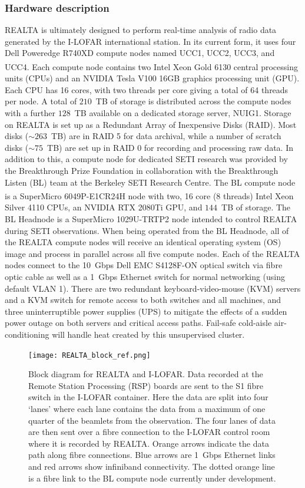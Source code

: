 \subsubsection{Hardware description}
REALTA is ultimately designed to perform real-time analysis of radio data generated by the I-LOFAR international station. In its current form, it uses four Dell Poweredge R740XD compute nodes named UCC1, UCC2, UCC3, and UCC4. Each compute node contains two Intel Xeon\textsuperscript{\textregistered} Gold 6130 central processing units (CPUs) and an NVIDIA Tesla V100 16GB graphics processing unit (GPU). Each CPU has 16 cores, with two threads per core giving a total of 64 threads per node.  A total of $210$~TB of storage is distributed across the compute nodes with a further $128$~TB available on a dedicated storage server, NUIG1. Storage on REALTA is set up as a Redundant Array of Inexpensive Disks (RAID). Most disks ($\sim 263$~TB) are in RAID 5 for data archival, while a number of scratch disks ($\sim 75$~TB) are set up in RAID 0 for recording and processing raw data. In addition to this, a compute node for dedicated SETI research was provided by the Breakthrough Prize Foundation in collaboration with the Breakthrough Listen (BL) team at the Berkeley SETI Research Centre. The BL compute node is a SuperMicro 6049P-E1CR24H node with two, 16 core (8 threads) Intel Xeon\textsuperscript{\textregistered} Silver 4110 CPUs, an NVIDIA RTX 2080Ti GPU, and $144$~TB of storage. The BL Headnode is a SuperMicro 1029U-TRTP2 node intended to control REALTA during SETI observations. When being operated from the BL Headnode, all of the REALTA compute nodes will receive an identical operating system (OS) image and process in parallel across all five compute nodes. Each of the REALTA nodes connect to the 10~Gbps Dell EMC S4128F-ON optical switch via fibre optic cable as well as a 1~Gbps Ethernet switch for normal networking (using default VLAN 1). There are two redundant keyboard-video-mouse (KVM) servers and a KVM switch for remote access to both switches and all machines, and three uninterruptible power supplies (UPS) to mitigate the effects of a sudden power outage on both servers and critical access paths. Fail-safe cold-aisle air-conditioning will handle heat created by this unsupervised cluster.

\begin{figure}[h]
    \centering
    \texttt{[image: REALTA\_block\_ref.png]}
    \caption[Block diagram for REALTA and I-LOFAR.]{Block diagram for REALTA and I-LOFAR. Data recorded at the Remote Station Processing (RSP) boards are sent to the S1 fibre switch in the I-LOFAR container. Here the data are split into four `lanes' where each lane contains the data from a maximum of one quarter of the beamlets from the observation. The four lanes of data are then sent over a fibre connection to the I-LOFAR control room where it is recorded by REALTA. Orange arrows indicate the data path along fibre connections. Blue arrows are 1~Gbps Ethernet links and red arrows show infiniband connectivity. The dotted orange line is a fibre link to the BL compute node currently under development.}
    \label{fig:block}
\end{figure}

